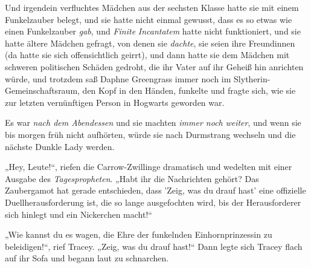 Und irgendein verfluchtes Mädchen aus der sechsten Klasse hatte sie mit einem Funkelzauber belegt, und sie hatte nicht einmal gewusst, dass es so etwas wie einen Funkelzauber \emph{gab}, und \emph{Finite} \emph{Incantatem} hatte nicht funktioniert, und sie hatte ältere Mädchen gefragt, von denen sie \emph{dachte}, sie seien ihre Freundinnen (da hatte sie sich offensichtlich geirrt), und dann hatte sie dem Mädchen mit schweren politischen Schäden gedroht, die ihr Vater auf ihr Geheiß hin anrichten würde, und trotzdem saß Daphne Greengrass immer noch im Slytherin-Gemeinschaftsraum, den Kopf in den Händen, funkelte und fragte sich, wie sie zur letzten vernünftigen Person in Hogwarts geworden war.

Es war \emph{nach dem Abendessen} und sie machten \emph{immer noch} \emph{weiter}, und wenn sie bis morgen früh nicht aufhörten, würde sie nach Durmstrang wechseln und die nächste Dunkle Lady werden.

„Hey, Leute!“, riefen die Carrow-Zwillinge dramatisch und wedelten mit einer Ausgabe des \emph{Tagespropheten}. „Habt ihr die Nachrichten gehört? Das Zaubergamot hat gerade entschieden, dass 'Zeig, was du drauf hast' eine offizielle Duellherausforderung ist, die so lange ausgefochten wird, bis der Herausforderer sich hinlegt und ein Nickerchen macht!“

„Wie kannst du es wagen, die Ehre der funkelnden Einhornprinzessin zu beleidigen!“, rief Tracey. „Zeig, was du drauf hast!“ Dann legte sich Tracey flach auf ihr Sofa und begann laut zu schnarchen.

